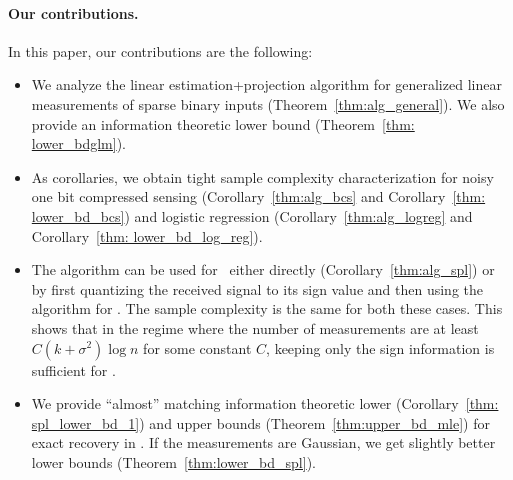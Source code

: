 \paragraph{Our contributions.} In this paper, our contributions are the following:
\begin{itemize}
    \item We analyze the linear estimation+projection algorithm \cite{vershyninPlan}   for generalized linear measurements of sparse binary inputs (Theorem~\ref{thm:alg_general}). We also provide an information theoretic lower bound (Theorem~\ref{thm: lower_bdglm}).
    \item As corollaries, we obtain tight sample complexity characterization for noisy one bit compressed sensing   (Corollary~\ref{thm:alg_bcs} and Corollary~\ref{thm: lower_bd_bcs}) and logistic regression (Corollary~\ref{thm:alg_logreg} and Corollary~\ref{thm: lower_bd_log_reg}). %
    \item The algorithm can be used for \spl\ either directly (Corollary~\ref{thm:alg_spl}) or by first quantizing the received signal to its sign value and then using the algorithm for \bcs. The sample complexity is the same for both these cases. This shows that in the regime where the number of measurements are at least $C(k+\sigma^2)\log{n}$ for some constant $C$, keeping only the sign information is sufficient for \spl. %
    \item We provide ``almost'' matching information theoretic lower (Corollary~\ref{thm: spl_lower_bd_1}) and upper bounds (Theorem~\ref{thm:upper_bd_mle}) for exact recovery in \spl. If the measurements are Gaussian, we get slightly better lower bounds (Theorem~\ref{thm:lower_bd_spl}).
\end{itemize}


